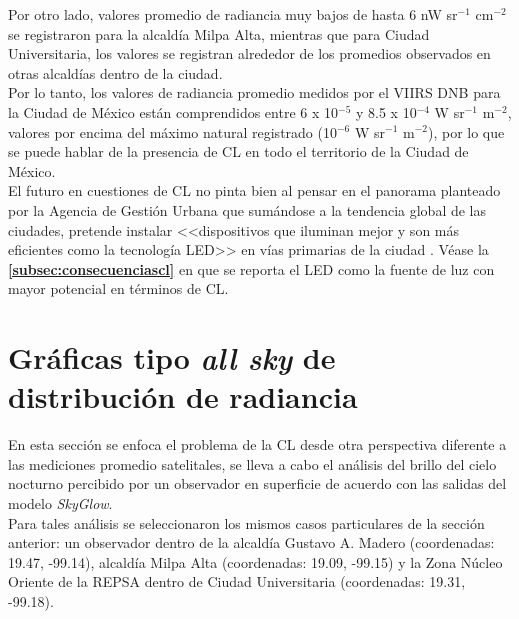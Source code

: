 \newpage

Por otro lado, valores promedio de radiancia muy bajos de hasta 6 nW sr$^{-1}$  cm$^{-2}$ se registraron para la alcaldía Milpa Alta, mientras que para Ciudad Universitaria, los valores se registran alrededor de los promedios observados en otras alcaldías dentro de la ciudad.\\

Por lo tanto, los valores de radiancia promedio medidos por el VIIRS DNB para la Ciudad de México están comprendidos entre 6 x 10$^{-5}$ y 8.5 x 10$^{-4}$ W sr$^{-1}$ m$^{-2}$, valores por encima del máximo natural registrado (10$^{-6}$ W sr$^{-1}$  m$^{-2}$), por lo que se puede hablar de la presencia de CL en todo el territorio de la Ciudad de México.\\ 

El futuro en cuestiones de CL no pinta bien al pensar en el panorama planteado por la Agencia de Gestión Urbana que sumándose a la tendencia global de las ciudades, pretende instalar <<dispositivos que iluminan mejor y son más eficientes como la tecnología LED>> en vías primarias de la ciudad \citep{Universal2017}. Véase la \textbf{\autoref{subsec:consecuenciascl}} en que se reporta el LED como la fuente de luz con mayor potencial en términos de CL.\\ 


\section{Gráficas tipo \textit{all sky} de distribución de radiancia}

En esta sección se enfoca el problema de la CL desde otra perspectiva diferente a las mediciones promedio satelitales, se lleva a cabo el análisis del brillo del cielo nocturno percibido por un observador en superficie de acuerdo con las salidas del modelo \textit{SkyGlow}.\\ 

Para tales análisis se seleccionaron los mismos casos particulares de la sección anterior: un observador dentro de la alcaldía Gustavo A. Madero (coordenadas: 19.47\grad, -99.14\grad), alcaldía Milpa Alta (coordenadas: 19.09\grad, -99.15\grad) y la Zona Núcleo Oriente de la REPSA dentro de Ciudad Universitaria (coordenadas: 19.31\grad, -99.18\grad).\\

\newpage

